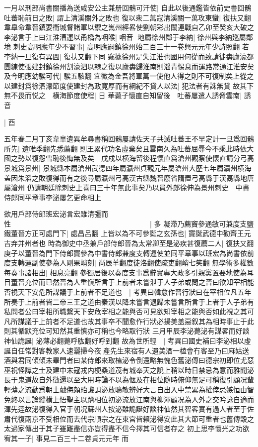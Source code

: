 一月以刑部尚書關播為送咸安公主兼册回鶻可汗使|{
	自此以後通鑑皆依前史書回鶻}
吐蕃恥前日之敗|{
	謂上清溪關外之敗也}
復以衆二萬寇清溪關一萬攻東蠻|{
	復扶又翻}
韋臯命韋晉鎮要衝城督諸軍以禦之嶲州經畧使劉朝彩出關連戰自乙卯至癸亥大破之　李泌言于上曰江淮漕運以甬橋為咽喉|{
	咽音}
地屬徐州鄰于李納|{
	徐州與李納廵屬鄰境}
刺史高明應年少不習事|{
	高明應嗣鎮徐州始二百三十一卷興元元年少詩照翻}
若李納一旦復有異圖|{
	復扶又翻下同}
竊據徐州是失江淮也國用何從而致請徙夀廬濠都團練使張建封鎮徐州割濠泗以隸之復以廬夀歸淮南則淄青惕息而運路常通江淮安矣及今明應幼騃可代|{
	騃五駭翻}
宜徵為金吾將軍萬一使他人得之則不可復制矣上從之以建封爲徐泗濠節度使建封為政寛厚而有綱紀不貸人以法|{
	犯法者有誅無貸}
故其下無不畏而悦之　横海節度使程|{
	日}
華薨子懷直自知留後　吐蕃屢遣人誘脅雲南|{
	誘音}


|{
	酉}


五年春二月丁亥韋臯遺異牟尋書稱回鶻屢請佐天子共滅吐蕃王不早定計一旦爲回鶻所先|{
	遺唯季翻先悉薦翻}
則王累代功名虛棄矣且雲南久為吐蕃屈辱今不乘此時依大國之勢以復怨雪恥後悔無及矣　戊戍以横海留後程懷直爲滄州觀察使懷直請分弓高景城爲景州|{
	景城縣本屬滄州武德四年屬瀛州貞觀元年屬滄州大歷七年屬瀛州横海盖因朱滔之敗復得而有之後尋屬瀛州弓高漢古縣魏晉廢省隋置弓高縣于漢鬲縣地唐屬滄州}
仍請朝廷除刺史上喜曰三十年無此事矣乃以員外郎徐伸為景州刺史　中書侍郎同平章事李泌屢乞更命相上

欲用戶部侍郎班宏泌言宏雖清彊而性　　　　　　　　　　　　　　　　　　　　|{
	多}
凝滯乃薦竇參通敏可兼度支鹽鐵董晉方正可處門下|{
	處昌呂翻}
上皆以為不可參誕之玄孫也|{
	竇誕武德中勸齊王元吉弃并州者也}
時為御史中丞兼戶部侍郎晉為太常卿至是泌疾甚復薦二人|{
	復扶又翻}
庚子以董晉為門下侍郎竇參為中書侍郎兼度支轉運使並同平章事以班宏為尚書依前度支轉運副使參為人剛果峭刻|{
	尚辰羊翻度徒洛翻使疏吏翻峭七笑翻}
無學術多權數每奏事諸相出|{
	相息亮翻}
參獨居後以奏度支事爲辭實專大政多引親黨置要地使為耳目董晉充位而已然晉為人重愼所言于上前者未嘗泄于人子弟或問之晉曰欲知宰相能否視天下安危所謀議于上前者不足道也　|{
	考異曰韓愈作晉行狀曰在宰相位凡五年所奏于上前者皆二帝三王之道由秦漢以降未嘗言退歸未嘗言所言于上者于人子弟有私問者公曰宰相所職繫天下安危宰相之能與否可見欲知宰相之能與否如此視之其可凡所謀議于上前者不足道也故其事卒不聞愈作行狀必揚美盖惡叙其為相時事止于此則其循默充位可知然其重慎亦可稱也今略取行狀}
三月甲辰李泌薨泌有謀畧而好談神仙詭誕|{
	泌薄必翻薨呼肱翻好呼到翻}
故為世所輕　|{
	考異曰國史補曰李泌相以虛誕自任常對客教家人速灑掃今夜產先生來宿有人遺美酒一榼會冇客至乃曰麻姑送酒與君同傾傾未畢門者曰某侍郎來取榼泌令倒還略無愧色舊泌傳曰德宗初即位尤惡巫祝怪譚之士及建中末寇戎内梗桑道茂有城奉天之說上稍以時日禁忌為意而雅聞泌長于鬼道故自外徵還以至大用時論不以為惬及在相位隨時俯仰無足可稱復引顧况輩輕薄之流動爲朝士戲侮頗貽譏誚泌放曠敏辨好大言自出入中禁累為權倖忌嫉恒由智免終以言論縱横上悟聖主以躋相位初泌流放江南與柳渾顧况為人外之交吟詠自適而渾先逹故泌復得入官于朝况蘇州人按泌雖詭誕好談神仙然其智畧實有過人者至于佐肅代復兩京不受相位而去代宗順宗之在東宫皆賴泌得安此其大節可重者也舊傳毀之太過家傳出于其子雖難盡信亦豈得盡不信今擇其可信者存之}
初上思李懷光之功欲宥其一子|{
	事見二百三十二卷貞元元年}
而

